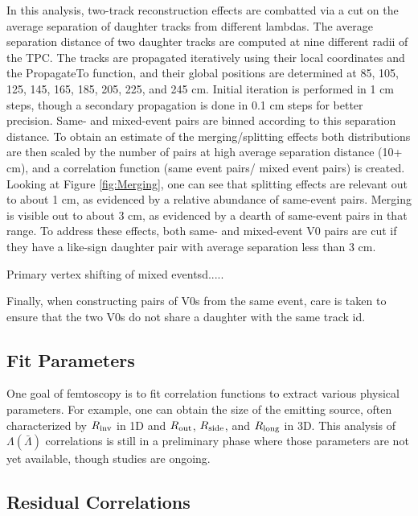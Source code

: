 {In this analysis, two-track reconstruction effects are combatted via a cut on the average separation of daughter tracks from different lambdas.  The average separation distance of two daughter tracks are computed at nine different radii of the TPC.  The tracks are propagated iteratively using their local coordinates and the PropagateTo function, and their global positions are determined at 85, 105, 125, 145, 165, 185, 205, 225, and 245 cm.  Initial iteration is performed in 1 cm steps, though a secondary propagation is done in 0.1 cm steps for better precision.  Same- and mixed-event pairs are binned according to this separation distance.  To obtain an estimate of the merging/splitting effects both distributions are then scaled by the number of pairs at high average separation distance (10+ cm), and a correlation function (same event pairs/ mixed event pairs) is created.  Looking at Figure \ref{fig:Merging}, one can see that splitting effects are relevant out to about 1 cm, as evidenced by a relative abundance of same-event pairs.  Merging is visible out to about 3 cm, as evidenced by a dearth of same-event pairs in that range.  To address these effects, both same- and mixed-event V0 pairs are cut if they have a like-sign daughter pair with average separation less than 3 cm.

Primary vertex shifting of mixed eventsd.....

Finally, when constructing pairs of V0s from the same event, care is taken to ensure that the two V0s do not share a daughter with the same track id. 

\subsection{Fit Parameters}
\label{sec:Parameters}

One goal of femtoscopy is to fit correlation functions to extract various physical parameters.  For example, one can obtain the size of the emitting source, often characterized by $R_{\rm inv}$ in 1D and $R_{\rm out}$, $R_{\rm side}$, and $R_{\rm long}$ in 3D.  This analysis of $\Lambda(\bar{\Lambda})$ correlations is still in a preliminary phase where those parameters are not yet available, though studies are ongoing.  

\subsection{Residual Correlations}
\label{sec:Residual}

}
